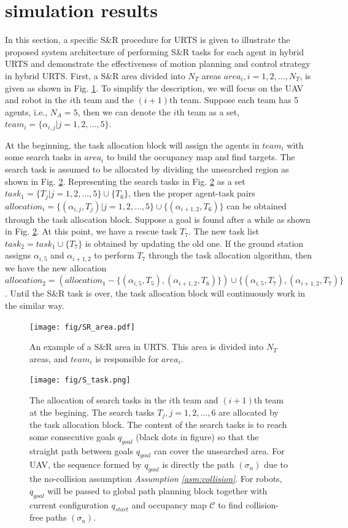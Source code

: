 \documentclass[journal,12pt,onecolumn,draftclsnofoot,]{IEEEtran}
\begin{document}
\section{simulation results}
In this section, a specific S\&R procedure for URTS is given to illustrate the proposed system architecture of performing S\&R tasks for each agent in hybrid URTS and demonstrate the effectiveness of motion planning and control strategy in hybrid URTS. First, a S\&R area divided into $N_T$ areas $area_i,i=1,2,...,N_T$, is given as shown in Fig. \ref{fig:SR_area}. To simplify the description, we will focus on the UAV and robot in the $i$th team and the $(i+1)$th team. Suppose each team has 5 agents, i.e., $N_A=5$, then we can denote the $i$th team as a set, $team_i=\{ \alpha_{i,j} | j=1,2,...,5 \}$.

At the beginning, the task allocation block will assign the agents in $team_i$ with some search tasks in $area_i$ to build the occupancy map and find targets. The search task is assumed to be allocated by dividing the unsearched region as shown in Fig. \ref{fig:S_task}. Representing the search tasks in Fig. \ref{fig:S_task} as a set $task_1=\{ T_j | j=1,2,...,5 \}\cup\{T_6\}$, then the proper agent-task pairs $allocation_i=\{ (\alpha_{i,j},T_j) | j=1,2,...,5 \}\cup\{(\alpha_{i+1,2},T_6)\}$ can be obtained through the task allocation block. Suppose a goal is found after a while as shown in Fig. \ref{fig:S_task}. At this point, we have a rescue task $T_7$. The new task list $task_2=task_1\cup\{ T_7 \}$ is obtained by updating the old one. If the ground station assigns $\alpha_{i,5}$ and $\alpha_{i+1,2}$ to perform $T_7$ through the task allocation algorithm, then we have the new allocation $allocation_2=(allocation_1-\{ (\alpha_{i,5},T_5),(\alpha_{i+1,2},T_6) \})\cup\{ (\alpha_{i,5},T_7),(\alpha_{i+1,2},T_7) \}$. Until the S\&R task is over, the task allocation block will continuously work in the similar way.
\begin{figure}[htbp]
    \centering
    \texttt{[image: fig/SR\_area.pdf]}\caption{An example of a S\&R area in URTS. This area is divided into $N_T$ areas, and $team_i$ is responsible for $area_i$.}%
    \label{fig:SR_area}
\end{figure}
\begin{figure}[htbp]
    \centering
    \texttt{[image: fig/S\_task.png]}\caption{The allocation of search tasks in the $i$th team and $(i+1)$th team at the begining. The search tasks $T_j,j=1,2,...,6$ are allocated by the task allocation block. The content of the search tasks is to reach some consecutive goals $q_{goal}$ (black dots in figure) so that the straight path between goals $q_{goal}$ can cover the unsearched area. For UAV, the sequence formed by $q_{goal}$ is directly the path $(\sigma_n)$ due to the no-collision assumption \textit{Assumption \ref{asm:collision}}. For robots, $q_{goal}$ will be passed to global path planning block together with current configuration $q_{start}$ and occupancy map $\mathcal{C}$ to find collision-free paths $(\sigma_n)$.}
    \label{fig:S_task}
\end{figure}
\end{document}
